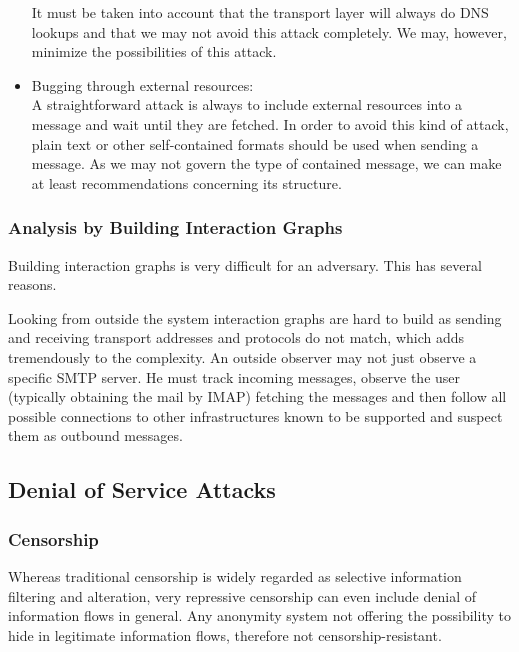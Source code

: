 \begin{itemize}
	It must be taken into account that the transport layer will always do DNS lookups and that we may not avoid this attack completely. We may, however, minimize the possibilities of this attack.
	
	\item Bugging through external resources:\\
	A straightforward attack is always to include external resources into a message and wait until they are fetched. In order to avoid this kind of attack, plain text or other self-contained formats should be used when sending a message. As we may not govern the type of contained message, we can make at least recommendations concerning its structure.
\end{itemize}

\subsubsection{Analysis by Building Interaction Graphs\label{sec:analysisInteractionGraphs}}
Building interaction graphs is very difficult for an adversary. This has several reasons.

Looking from outside the system interaction graphs are hard to build as sending and receiving transport addresses and protocols do not match, which adds tremendously to the complexity. An outside observer may not just observe a specific SMTP server. He must track incoming messages, observe the user (typically obtaining the mail by IMAP) fetching the messages and then follow all possible connections to other infrastructures known to be supported and suspect them as outbound messages.


\subsection{Denial of Service Attacks}
\subsubsection{Censorship}
Whereas traditional censorship is widely regarded as selective information filtering and alteration, very repressive censorship can even include denial of information flows in general. Any anonymity system not offering the possibility to hide in legitimate information flows, therefore not censorship-resistant.

